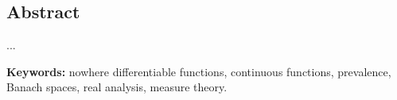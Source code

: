 \begin{otherlanguage}{english}
\chapter*{Abstract}

...

\bigskip
\noindent\textbf{Keywords:} nowhere differentiable functions, continuous
functions, prevalence, Banach spaces, real analysis, measure theory.
\end{otherlanguage}